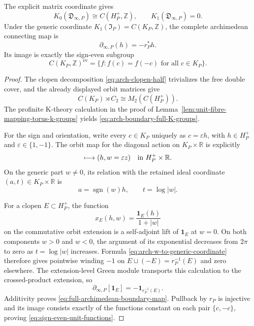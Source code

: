 \begin{theorem}
\label{thm:full-archimedean-unit-fibre-boundary}
The explicit matrix coordinate gives
\begin{equation}
 K_0(\mathfrak D_{\infty,P})\cong C(H_P^+,\mathbb Z),
 \qquad
 K_1(\mathfrak D_{\infty,P})=0.
 \label{eq:arch-boundary-full-K-groups}
\end{equation}
Under the generic coordinate
\(K_1(\mathfrak I_P)=C(K_P,\mathbb Z)\), the complete archimedean
connecting map is
\begin{equation}
 \partial_{\infty,P}(h)=-r_P^*h.
 \label{eq:full-archimedean-boundary-map}
\end{equation}
Its image is exactly the sign-even subgroup
\begin{equation}
 C(K_P,\mathbb Z)^{\mathrm{ev}}
 =\{f:f(c)=f(-c)\text{ for all }c\in K_P\}.
 \label{eq:sign-even-unit-functions}
\end{equation}
\end{theorem}

\begin{proof}
The clopen decomposition \eqref{eq:arch-clopen-half} trivializes the free
double cover, and the already displayed orbit matrices give
\[
 C(K_P)\rtimes C_2\cong M_2(C(H_P^+)).
\]
The profinite K-theory calculation in the proof of
Lemma~\ref{lem:unit-fibre-mapping-torus-k-groups} yields
\eqref{eq:arch-boundary-full-K-groups}.

For the sign and orientation, write every \(c\in K_P\) uniquely as
\(c=\varepsilon h\), with \(h\in H_P^+\) and
\(\varepsilon\in\{1,-1\}\).  The orbit map for the diagonal action on
\(K_P\times\mathbb R\) is explicitly
\begin{equation}
 [(\varepsilon h,z)]\longmapsto(h,w=\varepsilon z)
 \quad\hbox{in }H_P^+\times\mathbb R.
 \label{eq:arch-orbit-coordinate-w}
\end{equation}
On the generic part \(w\ne0\), its relation with the retained ideal coordinate
\((a,t)\in K_P\times\mathbb R\) is
\begin{equation}
 a=\operatorname{sgn}(w)h,
 \qquad t=\log|w|.
 \label{eq:arch-w-to-generic-coordinate}
\end{equation}

For a clopen \(E\subset H_P^+\), the function
\[
 x_E(h,w)=\frac{\mathbf1_E(h)}{1+|w|}
\]
on the commutative orbit extension is a self-adjoint lift of
\(\mathbf1_E\) at \(w=0\).  On both components \(w>0\) and \(w<0\), the
argument of its exponential decreases from \(2\pi\) to zero as
\(t=\log|w|\) increases.  Formula
\eqref{eq:arch-w-to-generic-coordinate} therefore gives pointwise winding
\(-1\) on
\(E\sqcup(-E)=r_P^{-1}(E)\) and zero elsewhere.  The extension-level Green
module transports this calculation to the crossed-product extension, so
\[
 \partial_{\infty,P}[\mathbf1_E]
 =-\mathbf1_{r_P^{-1}(E)}.
\]
Additivity proves \eqref{eq:full-archimedean-boundary-map}.  Pullback by
\(r_P\) is injective and its image consists exactly of the functions constant
on each pair \(\{c,-c\}\), proving
\eqref{eq:sign-even-unit-functions}.
\end{proof}

